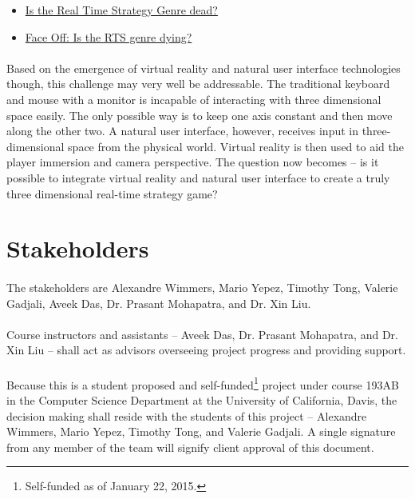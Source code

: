 \begin{itemize}
	\item \href{http://www.giantbomb.com/profile/scroll/blog/is-the-real-time-strategy-genre-dead/104746/}{Is the Real Time Strategy Genre dead?}
	\item \href{http://www.pcgamer.com/face-off-is-the-rts-genre-dying/}{Face Off: Is the RTS genre dying?}
\end{itemize}

\paragraph{} Based on the emergence of virtual reality and natural user interface technologies though, this challenge may very well be addressable. The traditional keyboard and mouse with a monitor is incapable of interacting with three dimensional space easily. The only possible way is to keep one axis constant and then move along the other two. A natural user interface, however, receives input in three-dimensional space from the physical world. Virtual reality is then used to aid the player immersion and camera perspective. The question now becomes  -- is it possible to integrate virtual reality and natural user interface to create a truly three dimensional real-time strategy game?

\section{Stakeholders}

\paragraph{} The stakeholders are Alexandre Wimmers, Mario Yepez, Timothy Tong, Valerie Gadjali, Aveek Das, Dr. Prasant Mohapatra, and Dr. Xin Liu. 

\paragraph{} Course instructors and assistants -- Aveek Das, Dr. Prasant Mohapatra, and Dr. Xin Liu --  shall act as advisors overseeing project progress and providing support.

\paragraph{} Because this is a student proposed and self-funded\footnote{Self-funded as of January 22, 2015.} project under course 193AB in the Computer Science Department at the University of California, Davis, the decision making shall reside with the students of this project -- Alexandre Wimmers, Mario Yepez, Timothy Tong, and Valerie Gadjali. A single signature from any member of the team will signify client approval of this document.


